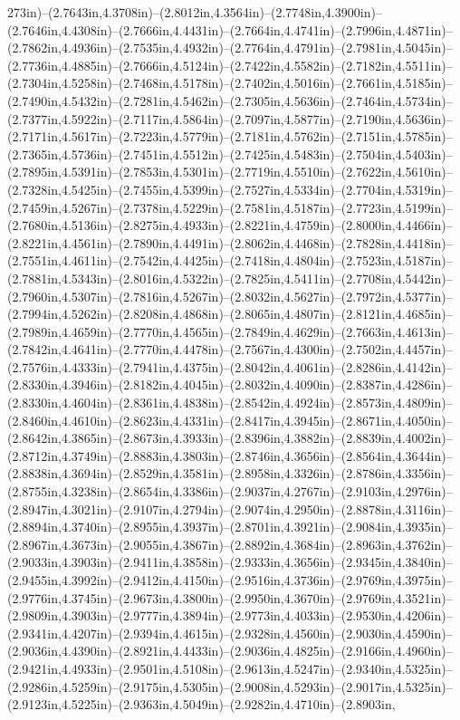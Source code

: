 273in)--(2.7643in,4.3708in)--(2.8012in,4.3564in)--(2.7748in,4.3900in)--(2.7646in,4.4308in)--(2.7666in,4.4431in)--(2.7664in,4.4741in)--(2.7996in,4.4871in)--(2.7862in,4.4936in)--(2.7535in,4.4932in)--(2.7764in,4.4791in)--(2.7981in,4.5045in)--(2.7736in,4.4885in)--(2.7666in,4.5124in)--(2.7422in,4.5582in)--(2.7182in,4.5511in)--(2.7304in,4.5258in)--(2.7468in,4.5178in)--(2.7402in,4.5016in)--(2.7661in,4.5185in)--(2.7490in,4.5432in)--(2.7281in,4.5462in)--(2.7305in,4.5636in)--(2.7464in,4.5734in)--(2.7377in,4.5922in)--(2.7117in,4.5864in)--(2.7097in,4.5877in)--(2.7190in,4.5636in)--(2.7171in,4.5617in)--(2.7223in,4.5779in)--(2.7181in,4.5762in)--(2.7151in,4.5785in)--(2.7365in,4.5736in)--(2.7451in,4.5512in)--(2.7425in,4.5483in)--(2.7504in,4.5403in)--(2.7895in,4.5391in)--(2.7853in,4.5301in)--(2.7719in,4.5510in)--(2.7622in,4.5610in)--(2.7328in,4.5425in)--(2.7455in,4.5399in)--(2.7527in,4.5334in)--(2.7704in,4.5319in)--(2.7459in,4.5267in)--(2.7378in,4.5229in)--(2.7581in,4.5187in)--(2.7723in,4.5199in)--(2.7680in,4.5136in)--(2.8275in,4.4933in)--(2.8221in,4.4759in)--(2.8000in,4.4466in)--(2.8221in,4.4561in)--(2.7890in,4.4491in)--(2.8062in,4.4468in)--(2.7828in,4.4418in)--(2.7551in,4.4611in)--(2.7542in,4.4425in)--(2.7418in,4.4804in)--(2.7523in,4.5187in)--(2.7881in,4.5343in)--(2.8016in,4.5322in)--(2.7825in,4.5411in)--(2.7708in,4.5442in)--(2.7960in,4.5307in)--(2.7816in,4.5267in)--(2.8032in,4.5627in)--(2.7972in,4.5377in)--(2.7994in,4.5262in)--(2.8208in,4.4868in)--(2.8065in,4.4807in)--(2.8121in,4.4685in)--(2.7989in,4.4659in)--(2.7770in,4.4565in)--(2.7849in,4.4629in)--(2.7663in,4.4613in)--(2.7842in,4.4641in)--(2.7770in,4.4478in)--(2.7567in,4.4300in)--(2.7502in,4.4457in)--(2.7576in,4.4333in)--(2.7941in,4.4375in)--(2.8042in,4.4061in)--(2.8286in,4.4142in)--(2.8330in,4.3946in)--(2.8182in,4.4045in)--(2.8032in,4.4090in)--(2.8387in,4.4286in)--(2.8330in,4.4604in)--(2.8361in,4.4838in)--(2.8542in,4.4924in)--(2.8573in,4.4809in)--(2.8460in,4.4610in)--(2.8623in,4.4331in)--(2.8417in,4.3945in)--(2.8671in,4.4050in)--(2.8642in,4.3865in)--(2.8673in,4.3933in)--(2.8396in,4.3882in)--(2.8839in,4.4002in)--(2.8712in,4.3749in)--(2.8883in,4.3803in)--(2.8746in,4.3656in)--(2.8564in,4.3644in)--(2.8838in,4.3694in)--(2.8529in,4.3581in)--(2.8958in,4.3326in)--(2.8786in,4.3356in)--(2.8755in,4.3238in)--(2.8654in,4.3386in)--(2.9037in,4.2767in)--(2.9103in,4.2976in)--(2.8947in,4.3021in)--(2.9107in,4.2794in)--(2.9074in,4.2950in)--(2.8878in,4.3116in)--(2.8894in,4.3740in)--(2.8955in,4.3937in)--(2.8701in,4.3921in)--(2.9084in,4.3935in)--(2.8967in,4.3673in)--(2.9055in,4.3867in)--(2.8892in,4.3684in)--(2.8963in,4.3762in)--(2.9033in,4.3903in)--(2.9411in,4.3858in)--(2.9333in,4.3656in)--(2.9345in,4.3840in)--(2.9455in,4.3992in)--(2.9412in,4.4150in)--(2.9516in,4.3736in)--(2.9769in,4.3975in)--(2.9776in,4.3745in)--(2.9673in,4.3800in)--(2.9950in,4.3670in)--(2.9769in,4.3521in)--(2.9809in,4.3903in)--(2.9777in,4.3894in)--(2.9773in,4.4033in)--(2.9530in,4.4206in)--(2.9341in,4.4207in)--(2.9394in,4.4615in)--(2.9328in,4.4560in)--(2.9030in,4.4590in)--(2.9036in,4.4390in)--(2.8921in,4.4433in)--(2.9036in,4.4825in)--(2.9166in,4.4960in)--(2.9421in,4.4933in)--(2.9501in,4.5108in)--(2.9613in,4.5247in)--(2.9340in,4.5325in)--(2.9286in,4.5259in)--(2.9175in,4.5305in)--(2.9008in,4.5293in)--(2.9017in,4.5325in)--(2.9123in,4.5225in)--(2.9363in,4.5049in)--(2.9282in,4.4710in)--(2.8903in,